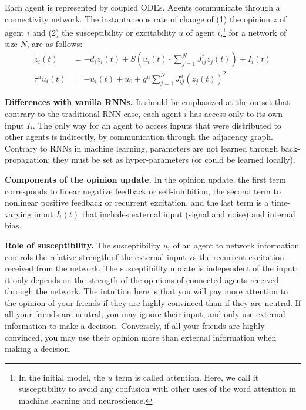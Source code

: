 \documentclass[]{article}
\begin{document}
Each agent is represented by coupled ODEs. Agents communicate through a connectivity network. The instantaneous rate of change of (1) the opinion $z$ of agent $i$ and (2) the susceptibility or excitability $u$ of agent $i$,\footnote{In the initial model, the $u$ term is called attention. Here, we call it susceptibility to avoid any confusion with other uses of the word attention in machine learning and neuroscience.} for a network of size $N$, are as follows:
\begin{align}
	\dot{z}_{i}(t) &= -d_{i}z_{i}(t) + S \left( u_i(t) \cdot  \sum^{N}_{j=1} J^z_{ij}z_{j}(t)  \right) + I_{i}(t) \\
	\tau^u \dot{u}_i(t) &= -u_i(t)+u_0+g^u \sum ^{N}_{j=1} J^u_{ij}(z_{j}(t))^2
\end{align}

\textbf{Differences with vanilla RNNs.} It should be emphasized at the outset that contrary to the traditional RNN case, each agent $i$ has access only to its own input $I_i$. The only way for an agent to access inputs that were distributed to other agents is indirectly, by communication through the adjacency graph. Contrary to RNNs in machine learning, parameters are not learned through back-propagation; they must be set as hyper-parameters (or could be learned locally). 

\textbf{Components of the opinion update.} In the opinion update, the first term corresponds to linear negative feedback or self-inhibition, the second term to nonlinear positive feedback or recurrent excitation, and the last term is a time-varying input $I_i(t)$ that includes external input (signal and noise) and internal bias.

\textbf{Role of susceptibility.} The susceptibility $u_i$ of an agent to network information controls the relative strength of the external input vs the recurrent excitation received from the network. The susceptibility update is independent of the input; it only depends on the strength of the opinions of connected agents received through the network. The intuition here is that you will pay more attention to the opinion of your friends if they are highly convinced than if they are neutral. If all your friends are neutral, you may ignore their input, and only use external information to make a decision. Conversely, if all your friends are highly convinced, you may use their opinion more than external information when making a decision.
\end{document}
